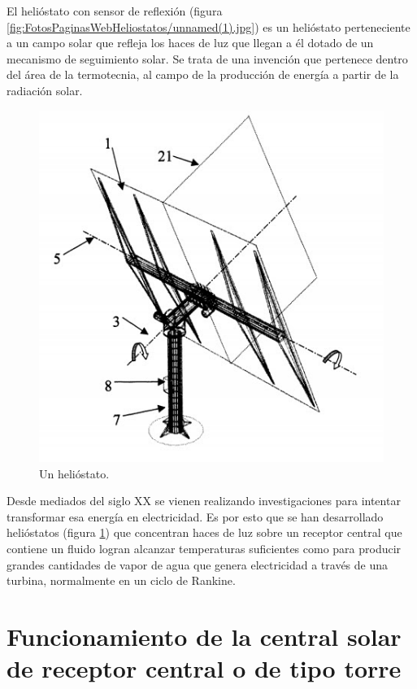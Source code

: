 El helióstato con sensor de reflexión (figura \ref{fig:FotosPaginasWebHeliostatos/unnamed(1).jpg}) es un helióstato perteneciente a un campo solar que refleja los haces de luz que llegan a él dotado de un mecanismo de seguimiento solar. Se trata de una invención que pertenece dentro del área de la termotecnia, al campo de la producción de energía a partir de la radiación solar.

\begin{figure}[h!]
  	\centering
	\includegraphics[scale=0.7]{FotosPaginasWebHeliostatos/unnamed.jpg}
	\caption{Un helióstato.~\cite{OepmWebSite} \label{fig:FotosPaginasWebHeliostatos/unnamed.jpg}}
\end{figure}

Desde mediados del siglo XX se vienen realizando investigaciones para intentar transformar esa energía en electricidad. Es por esto que se han desarrollado helióstatos (figura \ref{fig:FotosPaginasWebHeliostatos/unnamed.jpg}) que concentran haces de luz sobre un receptor central que contiene un fluido logran alcanzar temperaturas suficientes como para producir grandes cantidades de vapor de agua que genera electricidad a través de una turbina, normalmente en un ciclo de Rankine.

\cite{GstriatumWebSite} \cite{EcuRedWebSite}

\section{Funcionamiento de la central solar de receptor central o de tipo torre}

